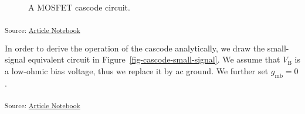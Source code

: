 \documentclass[
  a4paper,
  DIV=11,
  numbers=noendperiod]{scrartcl}
\begin{document}
\begin{figure}[H]


\caption{\label{fig-cascode-transistor}A MOSFET cascode circuit.}

\end{figure}%

\textsubscript{Source:
\href{https://iic-jku.github.io/analog-circuit-design/index.qmd.html}{Article
Notebook}}

In order to derive the operation of the cascode analytically, we draw
the small-signal equivalent circuit in
Figure~\ref{fig-cascode-small-signal}. We assume that \(V_\mathrm{B}\)
is a low-ohmic bias voltage, thus we replace it by ac ground. We further
set \(g_\mathrm{mb}= 0\).

\textsubscript{Source:
\href{https://iic-jku.github.io/analog-circuit-design/index.qmd.html}{Article
Notebook}}
\end{document}
